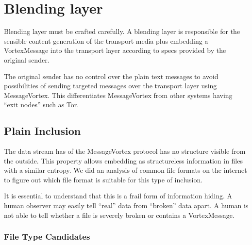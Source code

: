 \section{Blending layer}
Blending layer must be crafted carefully. A blending layer is responsible for the sensible content generation of the transport media plus embedding a VortexMessage into the transport layer according to specs provided by the original sender.

The original sender has no control over the plain text messages to avoid possibilities of sending targeted messages over the transport layer using MessageVortex. This differentiates MessageVortex from other systems having ``exit nodes'' such as Tor.

\subsection{Plain Inclusion}
The data stream has of the MessageVortex protocol has no structure visible from the outside. This property allows embedding as structureless information in files with a similar entropy. We did an analysis of common file formats on the internet to figure out which file format is suitable for this type of inclusion.

It is essential to understand that this is a frail form of information hiding. A human observer may easily tell ``real'' data from ``broken'' data apart. A human is not able to tell whether a file is severely broken or contains a VortexMessage.

\subsubsection{File Type Candidates}


